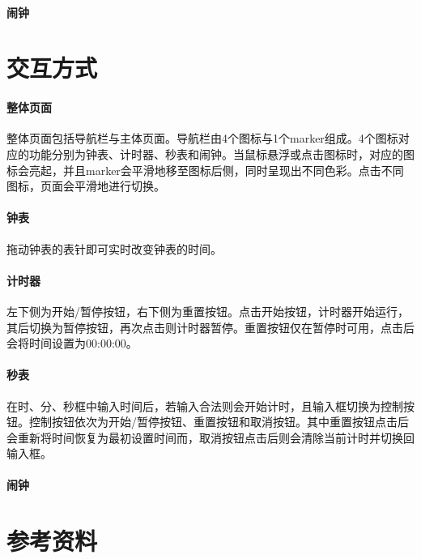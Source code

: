 \documentclass[UTF8]{ctexart}
\begin{document}
	\paragraph{闹钟}
	
	
	\section{交互方式} %
	\paragraph{整体页面}
	整体页面包括导航栏与主体页面。导航栏由4个图标与1个marker组成。4个图标对应的功能分别为钟表、计时器、秒表和闹钟。当鼠标悬浮或点击图标时，对应的图标会亮起，并且marker会平滑地移至图标后侧，同时呈现出不同色彩。点击不同图标，页面会平滑地进行切换。
	\paragraph{钟表}
	拖动钟表的表针即可实时改变钟表的时间。
	\paragraph{计时器}
	左下侧为开始/暂停按钮，右下侧为重置按钮。点击开始按钮，计时器开始运行，其后切换为暂停按钮，再次点击则计时器暂停。重置按钮仅在暂停时可用，点击后会将时间设置为00:00:00。
	\paragraph{秒表}
	在时、分、秒框中输入时间后，若输入合法则会开始计时，且输入框切换为控制按钮。控制按钮依次为开始/暂停按钮、重置按钮和取消按钮。其中重置按钮点击后会重新将时间恢复为最初设置时间而，取消按钮点击后则会清除当前计时并切换回输入框。
	\paragraph{闹钟}
	

	
	\section{参考资料} %
\end{document}
